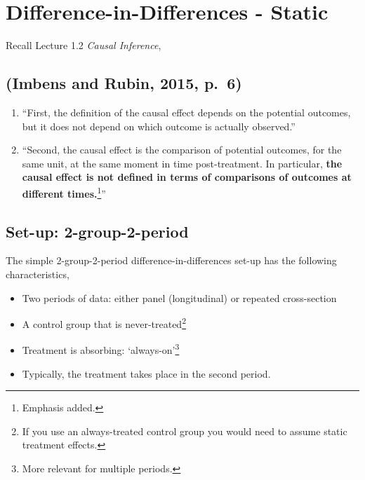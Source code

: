 \documentclass[
  letterpaper,
  DIV=11,
  numbers=noendperiod]{scrreprt}
\providecommand{\tightlist}{%
  \setlength{\itemsep}{0pt}\setlength{\parskip}{0pt}}\usepackage{longtable,booktabs,array}
\theoremstyle{definition}
\theoremstyle{remark}
\begin{document}
\hypertarget{difference-in-differences---static}{%
\chapter{Difference-in-Differences -
Static}\label{difference-in-differences---static}}

Recall Lecture 1.2 \emph{Causal Inference},

\hypertarget{imbens-and-rubin-2015-p.-6}{%
\section{(Imbens and Rubin, 2015,
p.~6)}\label{imbens-and-rubin-2015-p.-6}}

\begin{enumerate}
\def\labelenumi{\arabic{enumi}.}
\tightlist
\item
  ``First, the definition of the causal effect depends on the potential
  outcomes, but it does not depend on which outcome is actually
  observed.''
\item
  ``Second, the causal effect is the comparison of potential outcomes,
  for the same unit, at the same moment in time post-treatment. In
  particular, \textbf{the causal effect is not defined in terms of
  comparisons of outcomes at different times.}\footnote{Emphasis added.}''
\end{enumerate}

\hypertarget{set-up-2-group-2-period}{%
\section{Set-up: 2-group-2-period}\label{set-up-2-group-2-period}}

The simple 2-group-2-period difference-in-differences set-up has the
following characteristics,

\begin{itemize}
\tightlist
\item
  Two periods of data: either panel (longitudinal) or repeated
  cross-section
\item
  A control group that is never-treated\footnote{If you use an
    always-treated control group you would need to assume static
    treatment effects.}
\item
  Treatment is absorbing: `always-on'\footnote{More relevant for
    multiple periods.}
\item
  Typically, the treatment takes place in the second period.
\end{itemize}
\end{document}
